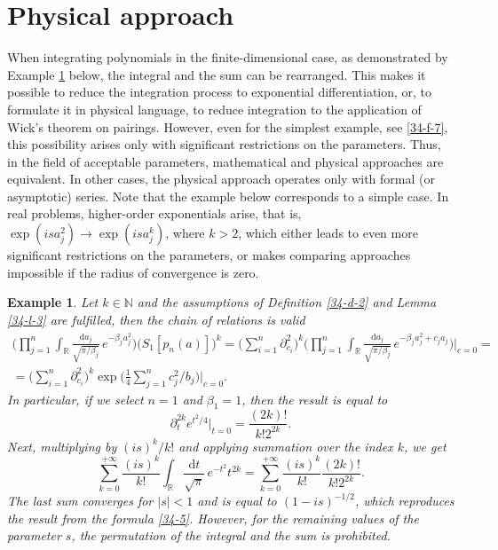 \documentclass[a4paper]{article}
\newtheorem{exm}{Example}
\begin{document}
\section{Physical approach}
\label{34:sec:p}
When integrating polynomials in the finite-dimensional case, as demonstrated by Example \ref{34-e-1} below, the integral and the sum can be rearranged. This makes it possible to reduce the integration process to exponential differentiation, or, to formulate it in physical language, to reduce integration to the application of Wick's theorem on pairings. However, even for the simplest example, see \eqref{34-f-7}, this possibility arises only with significant restrictions on the parameters. Thus, in the field of acceptable parameters, mathematical and physical approaches are equivalent. In other cases, the physical approach operates only with formal (or asymptotic) series. Note that the example below corresponds to a simple case. In real problems, higher-order exponentials arise, that is, $\exp(isa_j^2)\to\exp(isa_j^k)$, where $k>2$, which either leads to even more significant restrictions on the parameters, or makes comparing approaches impossible if the radius of convergence is zero.
\begin{exm}\label{34-e-1} Let $k\in\mathbb{N}$ and the assumptions of Definition \ref{34-d-2} and Lemma \ref{34-l-3} are fulfilled, then the chain of relations is valid
\begin{multline}\label{34-f-5}
\Bigg(\prod_{j=1}^{n}\int_{\mathbb{R}}\frac{\mathrm{d}a_j}{\sqrt{\pi/\beta_j}}
\,e^{-\beta_j^{\phantom{1}}a_j^2}\Bigg)\Big(S_1[p_n(a)]\Big)^k=
\bigg(\sum_{i=1}^n\partial_{c_i}^2\bigg)^k
\Bigg(\prod_{j=1}^{n}\int_{\mathbb{R}}\frac{\mathrm{d}a_j}{\sqrt{\pi/\beta_j}}
\,e^{-\beta_j^{\phantom{1}}a_j^2+c_ja_j}\Bigg)\Bigg|_{c=0}=\\=
\bigg(\sum_{i=1}^n\partial_{c_i}^2\bigg)^k\exp
\bigg(\frac{1}{4}\sum_{j=1}^nc_j^2/b_j\bigg)\bigg|_{c=0}.
\end{multline}
In particular, if we select $n=1$ and $\beta_1=1$, then the result is equal to
\begin{equation}\label{34-f-6}
\partial_{t}^{2k}e^{t^2/4}\Big|_{t=0}=\frac{(2k)!}{k!2^{2k}}.
\end{equation}
Next, multiplying by $(is)^k/k!$ and applying summation over the index $k$, we get
\begin{equation}\label{34-f-7}
\sum_{k=0}^{+\infty}\frac{(is)^k}{k!}\int_{\mathbb{R}}\frac{\mathrm{d}t}{\sqrt{\pi}}\,e^{-t^2}t^{2k}=
\sum_{k=0}^{+\infty}\frac{(is)^k}{k!}\frac{(2k)!}{k!2^{2k}}.
\end{equation}
The last sum converges for $|s|<1$ and is equal to $(1-is)^{-1/2}$, which reproduces the result from the formula \eqref{34-5}. However, for the remaining values of the parameter $s$, the permutation of the integral and the sum is prohibited.
\end{exm}
\end{document}
